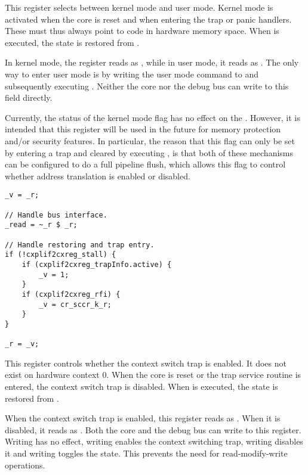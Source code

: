 This register selects between kernel mode and user mode. Kernel mode is 
activated when the core is reset and when entering the trap or panic handlers. 
These must thus always point to code in hardware memory space. When  
is executed, the state is restored from .

In kernel mode, the register reads as , while in user mode, it reads as 
. The only way to enter user mode is by writing the user mode command 
to  and subsequently executing . Neither the core nor the 
debug bus can write to this field directly.

Currently, the status of the kernel mode flag has no effect on the \rvex{}.
However, it is intended that this register will be used in the future for memory
protection and/or security features. In particular, the reason that this flag
can only be set by entering a trap and cleared by executing , is that
both of these mechanisms can be configured to do a full pipeline flush, which
allows this flag to control whether address translation is enabled or disabled.

\declaration{}
\implementation{}
\begin{lstlisting}
_v = _r;

// Handle bus interface.
_read = ~_r $ _r;

// Handle restoring and trap entry.
if (!cxplif2cxreg_stall) {
    if (cxplif2cxreg_trapInfo.active) {
        _v = 1;
    }
    if (cxplif2cxreg_rfi) {
        _v = cr_sccr_k_r;
    }
}

_r = _v;
\end{lstlisting}

This register controls whether the context switch trap is enabled. It does not 
exist on hardware context 0. When the core is reset or the trap service routine 
is entered, the context switch trap is disabled. When  is executed, 
the state is restored from .

When the context switch trap is enabled, this register reads as . When 
it is disabled, it reads as . Both the core and the debug bus can write 
to this register. Writing  has no effect, writing  enables the 
context switching trap, writing  disables it and writing  
toggles the state. This prevents the need for read-modify-write operations.

